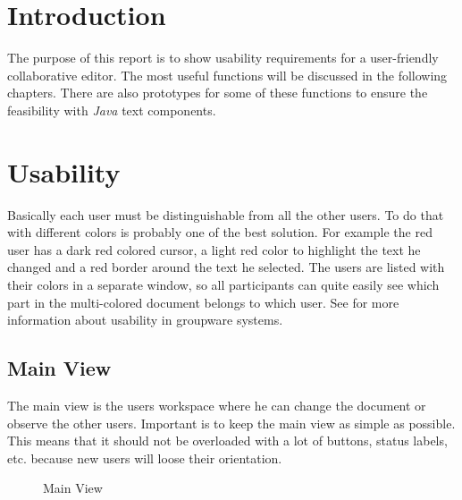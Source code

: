 \documentclass[11pt,a4paper]{article}
\begin{document}
\setlength{\parindent}{0pt}

\newtheorem{defn}{Definition}




\newpage

\tableofcontents
\newpage
\listoftables
\listoffigures
\newpage



\section{Introduction}
The purpose of this report is to show usability requirements for a user-friendly collaborative editor. The most useful functions will be discussed in the following chapters. There are also prototypes for some of these functions to ensure the feasibility with \emph{Java} text components.

\section{Usability}
Basically each user must be distinguishable from all the other users. To do that with different colors is probably one of the best solution. For example the red user has a dark red colored cursor, a light red color to highlight the text he changed and a red border around the text he selected. The users are listed with their colors in a separate window, so all participants can quite easily see which part in the multi-colored document belongs to which user. See \cite{usability} for more information about usability in groupware systems.

\subsection{Main View}
The main view is the users workspace where he can change the document or observe the other users. Important is to keep the main view as simple as possible. This means that it should not be overloaded with a lot of buttons, status labels, etc. because new users will loose their orientation.
\begin{figure}[H]
\centering
{}
\caption{Main View}
\end{figure}
\end{document}
